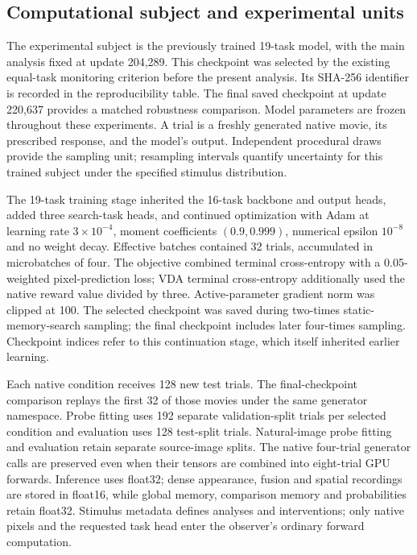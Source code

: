 \documentclass[11pt]{article}
\begin{document}
\subsection{Computational subject and experimental units}
The experimental subject is the previously trained 19-task model, with the main analysis fixed at update 204,289. This checkpoint was selected by the existing equal-task monitoring criterion before the present analysis. Its SHA-256 identifier is recorded in the reproducibility table. The final saved checkpoint at update 220,637 provides a matched robustness comparison. Model parameters are frozen throughout these experiments. A trial is a freshly generated native movie, its prescribed response, and the model's output. Independent procedural draws provide the sampling unit; resampling intervals quantify uncertainty for this trained subject under the specified stimulus distribution.

The 19-task training stage inherited the 16-task backbone and output heads, added three search-task heads, and continued optimization with Adam at learning rate $3\times10^{-4}$, moment coefficients $(0.9,0.999)$, numerical epsilon $10^{-8}$ and no weight decay. Effective batches contained 32 trials, accumulated in microbatches of four. The objective combined terminal cross-entropy with a 0.05-weighted pixel-prediction loss; VDA terminal cross-entropy additionally used the native reward value divided by three. Active-parameter gradient norm was clipped at 100. The selected checkpoint was saved during two-times static-memory-search sampling; the final checkpoint includes later four-times sampling. Checkpoint indices refer to this continuation stage, which itself inherited earlier learning.

Each native condition receives 128 new test trials. The final-checkpoint comparison replays the first 32 of those movies under the same generator namespace. Probe fitting uses 192 separate validation-split trials per selected condition and evaluation uses 128 test-split trials. Natural-image probe fitting and evaluation retain separate source-image splits. The native four-trial generator calls are preserved even when their tensors are combined into eight-trial GPU forwards. Inference uses float32; dense appearance, fusion and spatial recordings are stored in float16, while global memory, comparison memory and probabilities retain float32. Stimulus metadata defines analyses and interventions; only native pixels and the requested task head enter the observer's ordinary forward computation.
\end{document}
